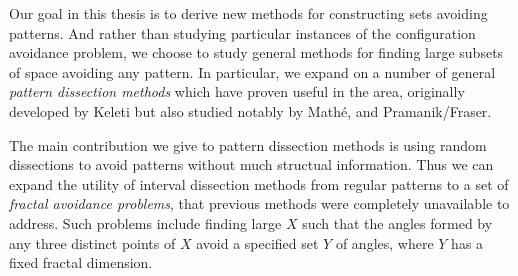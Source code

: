 Our goal in this thesis is to derive new methods for constructing sets avoiding patterns. And rather than studying particular instances of the configuration avoidance problem, we choose to study general methods for finding large subsets of space avoiding any pattern. In particular, we expand on a number of general {\it pattern dissection methods} which have proven useful in the area, originally developed by Keleti but also studied notably by Math\'{e}, and Pramanik/Fraser.

The main contribution we give to pattern dissection methods is using random dissections to avoid patterns without much structual information. Thus we can expand the utility of interval dissection methods from regular patterns to a set of {\it fractal avoidance problems}, that previous methods were completely unavailable to address. Such problems include finding large $X$ such that the angles formed by any three distinct points of $X$ avoid a specified set $Y$ of angles, where $Y$ has a fixed fractal dimension.

\endinput

Any text after an \endinput is ignored.
You could put scraps here or things in progress.